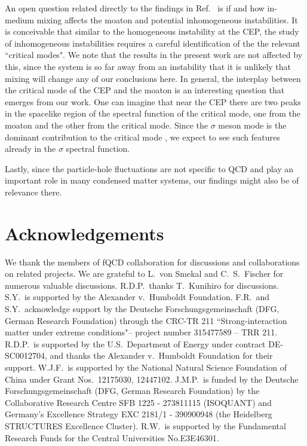 \documentclass[reprint,english,superscriptaddress,preprintnumbers,amsmath,amssymb,aps,prd,nofootinbib]{revtex4-2}
\begin{document}
An open question related directly to the findings in Ref.\ \cite{Haensch:2023sig} is if and how in-medium mixing affects the moaton and potential inhomogeneous instabilities. It is conceivable that similar to the homogeneous instability at the CEP, the study of inhomogeneous instabilities requires a careful identification of the the relevant ``critical modes". We note that the results in the present work are not affected by this, since the system is so far away from an instability that it is unlikely that mixing will change any of our conclusions here. In general, the interplay between the critical mode of the CEP and the moaton is an interesting question that emerges from our work. One can imagine that near the CEP there are two peaks in the spacelike region of the spectral function of the critical mode, one from the moaton and the other from the critical mode. Since the $\sigma$ meson mode is the dominant contribution to the critical mode \cite{Haensch:2023sig}, we expect to see such features already in the $\sigma$ spectral function. 

Lastly, since the particle-hole fluctuations are not specific to QCD and play an important role in many condensed matter systems, 
our findings might also be of relevance there.



\section{Acknowledgements}
%
We thank the members of fQCD collaboration \cite{fQCD} for discussions and collaborations on related projects. We are grateful to L.\ von Smekal  and C.\ S.\ Fischer for numerous valuable discussions.  R.D.P.\
thanks T.\ Kunihiro for discussions.
S.Y.\ is supported by the Alexander v.\ Humboldt Foundation.
F.R.\ and S.Y.\ acknowledge support by the Deutsche Forschungsgemeinschaft (DFG, German Research Foundation) through the CRC-TR 211 ``Strong-interaction matter under extreme conditions"– project number 315477589 – TRR 211.
R.D.P.~is supported by the U.S.~Department
of Energy under contract DE-SC0012704, and thanks
the Alexander v.\ Humboldt Foundation for their support.
W.J.F.\ is supported by the National Natural Science Foundation of China under Grant Nos.\ 12175030, 12447102. 
J.M.P.~is funded by the Deutsche Forschungsgemeinschaft (DFG, German Research Foundation) by the Collaborative Research Centre SFB 1225 - 273811115 (ISOQUANT) and Germany’s Excellence Strategy EXC 2181/1 - 390900948 (the Heidelberg STRUCTURES Excellence Cluster). 
R.W.\ is supported by the Fundamental Research Funds for the Central Universities No.E3E46301.
\end{document}
